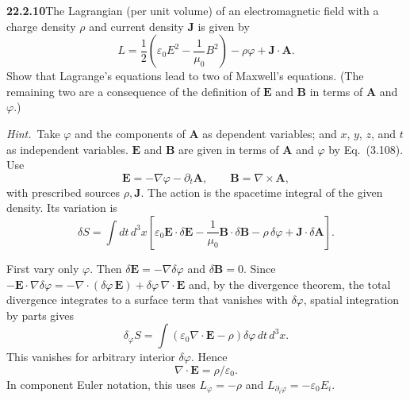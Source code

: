 \par\bigskip
\noindent\textbf{22.2.10}\quad The Lagrangian (per unit volume) of
an electromagnetic field with a charge density $\rho$ and current
density $\mathbf{J}$ is given by
\[
L=\frac{1}{2}\left(\varepsilon_{0}E^{2}
-\frac{1}{\mu_{0}}B^{2}\right)-\rho\varphi
+\mathbf{J}\cdot\mathbf{A}.
\]
Show that Lagrange's equations lead to two of Maxwell's
equations. (The remaining two are a consequence of the definition
of $\mathbf{E}$ and $\mathbf{B}$ in terms of $\mathbf{A}$ and
$\varphi$.)
\par\emph{Hint.}~Take $\varphi$ and the components of
$\mathbf{A}$ as dependent variables; and $x$, $y$, $z$, and $t$
as independent variables. $\mathbf{E}$ and $\mathbf{B}$ are given
in terms of $\mathbf{A}$ and $\varphi$ by Eq.~(3.108).
\solution
Use
\[
\mathbf E=-\nabla\varphi-\partial_t\mathbf A,\qquad
\mathbf B=\nabla\times\mathbf A,
\]
with prescribed sources $\rho,\mathbf J$. The action is the spacetime
integral of the given density. Its variation is
\[
\delta S=\int dt\,d^3x\left[
\varepsilon_0\mathbf E\cdot\delta\mathbf E
-\frac1{\mu_0}\mathbf B\cdot\delta\mathbf B
-\rho\,\delta\varphi+\mathbf J\cdot\delta\mathbf A\right].
\]

First vary only $\varphi$. Then $\delta\mathbf E=-\nabla\delta\varphi$
and $\delta\mathbf B=0$. Since
$-\mathbf E\cdot\nabla\delta\varphi
=-\nabla\cdot(\delta\varphi\,\mathbf E)+\delta\varphi\,\nabla\cdot\mathbf E$
and, by the divergence theorem, the total divergence integrates to a
surface term that vanishes with $\delta\varphi$, spatial integration
by parts gives
\[
\delta_\varphi S=\int
(\varepsilon_0\nabla\cdot\mathbf E-\rho)\delta\varphi\,dt\,d^3x.
\]
This vanishes for arbitrary interior $\delta\varphi$. Hence
\[
\boxed{\nabla\cdot\mathbf E=\rho/\varepsilon_0}.
\]
In component Euler notation, this uses
$L_\varphi=-\rho$ and $L_{\partial_i\varphi}=-\varepsilon_0E_i$.

